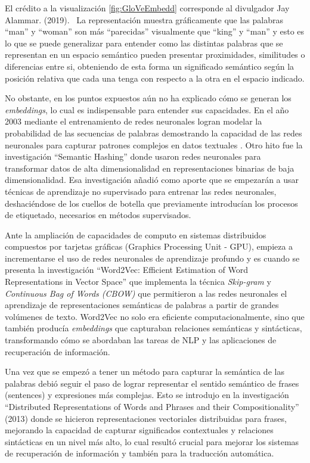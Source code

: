 \documentclass[
  12pt,
  openany]{book}
\begin{document}
El crédito a la visualización \ref{fig:GloVeEmbedd} \citep{wordtovec} corresponde al divulgador Jay Alammar. (2019). ~La representación muestra gráficamente que las palabras ``man'' y ``woman'' son más ``parecidas'' visualmente que ``king'' y ``man'' y esto es lo que se puede generalizar para entender como las distintas palabras que se representan en un espacio semántico pueden presentar proximidades, similitudes o diferencias entre si, obteniendo de esta forma un significado semántico según la posición relativa que cada una tenga con respecto a la otra en el espacio indicado.

No obstante, en los puntos expuestos aún no ha explicado cómo se generan los \emph{embeddings}, lo cual es indispensable para entender sus capacidades. En el año 2003 mediante el entrenamiento de redes neuronales logran modelar la probabilidad de las secuencias de palabras demostrando la capacidad de las redes neuronales para capturar patrones complejos en datos textuales \citep{Bengio:2003:NPL:944919.944966} . Otro hito fue la investigación ``Semantic Hashing'' \citep{salakhutdinov2009} donde usaron redes neuronales para transformar datos de alta dimensionalidad en representaciones binarias de baja dimensionalidad. Esa investigación añadió como aporte que se empezarán a usar técnicas de aprendizaje no supervisado para entrenar las redes neuronales, deshaciéndose de los cuellos de botella que previamente introducían los procesos de etiquetado, necesarios en métodos supervisados.

Ante la ampliación de capacidades de computo en sistemas distribuidos compuestos por tarjetas gráficas (Graphics Processing Unit - GPU), empieza a incrementarse el uso de redes neuronales de aprendizaje profundo y es cuando se presenta la investigación ``Word2Vec: Efficient Estimation of Word Representations in Vector Space'' \citep{mikolov2013} que implementa la técnica \emph{Skip-gram} y \emph{Continuous Bag of Words (CBOW)} que permitieron a las redes neuronales el aprendizaje de representaciones semánticas de palabras a partir de grandes volúmenes de texto. Word2Vec no solo era eficiente computacionalmente, sino que también producía \emph{embeddings} que capturaban relaciones semánticas y sintácticas, transformando cómo se abordaban las tareas de NLP y las aplicaciones de recuperación de información.

Una vez que se empezó a tener un método para capturar la semántica de las palabras debió seguir el paso de lograr representar el sentido semántico de frases (sentences) y expresiones más complejas. Esto se introdujo en la investigación ``Distributed Representations of Words and Phrases and their Compositionality'' (2013) \citep{mikolov2013a} donde se hicieron representaciones vectoriales distribuidas para frases, mejorando la capacidad de capturar significados contextuales y relaciones sintácticas en un nivel más alto, lo cual resultó crucial para mejorar los sistemas de recuperación de información y también para la traducción automática.
\end{document}
